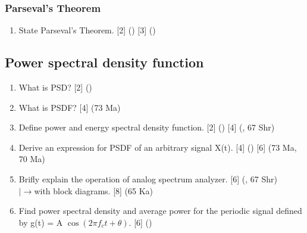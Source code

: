 \documentclass[12pt]{article}
\newcommand{\lb}{\\$\left|\rightarrow\right.$}
\begin{document}
    \subsubsection{Parseval's Theorem}
      \begin{enumerate}
        \item State Parseval's Theorem. \hfill [2] () [3] ()
      \end{enumerate}

    \subsection{Power spectral density function}
      \begin{enumerate}
        \item What is PSD? \hfill [2] ()

        \item What is PSDF? \hfill [4] (73 Ma)

        \item Define power and energy spectral density function. \hfill [2] () [4] (, 67 Shr)

        \item Derive an expression for PSDF of an arbitrary signal X(t). \hfill [4] () [6] (73 Ma, 70 Ma)

        \item Brifly explain the operation of analog spectrum analyzer. \hfill [6] (, 67 Shr)
        \lb with block diagrams. \hfill [8] (65 Ka)

        \item Find power spectral density and average power for the periodic signal defined by g(t) = A $\cos (2\pi f_c t +\theta)$. \hfill [6] ()
      \end{enumerate}
\end{document}
